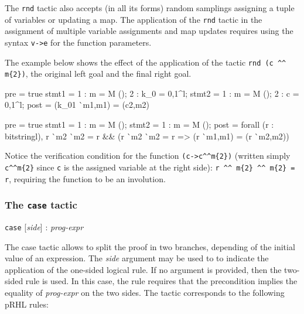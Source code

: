The \verb+rnd+ tactic also accepts (in all its forms) random samplings
assigning a tuple of variables or updating a map. The application of
the \verb+rnd+ tactic in the assignment of multiple variable
assignments and map updates requires using the syntax \verb+v->e+ for
the function parameters.


\Example The example below shows the effect of the application of the tactic
\verb+rnd (c ^^ m{2})+, the original left goal and the final
right goal.

\begin{minicode}{0.4}
pre   = true
stmt1 =   1 : m = M ();
          2 : k_0 = {0,1}^l;
stmt2 =   1 : m = M ();
          2 : c = {0,1}^l;
post  = (k_0{1} ^^ m{1},m{1}) 
            = (c{2},m{2})
\end{minicode}
\begin{minicode}{0.5}
pre   = true
stmt1 =   1 : m = M ();
stmt2 =   1 : m = M ();
post  = forall (r : bitstring{l}),
          r ^^ m{2} ^^ m{2} = r 
          && (r ^^ m{2} ^^ m{2} = r =>
            (r ^^ m{1},m{1}) = (r ^^ m{2},m{2}))
\end{minicode}
\vspace{2ex}

Notice the verification condition for the function \verb+(c->c^^m{2})+
(written simply \verb+c^^m{2}+ since \verb+c+ is the assigned variable at the
right side): \verb+r ^^ m{2} ^^ m{2} = r+, requiring the function to
be an involution.

\subsubsection{The \texttt{case} tactic}\label{tac:case}\DONE
\Syntax \verb+case+ [\textit{side}] : \textit{prog-expr}

\Description The case tactic allows to split the proof in two
branches, depending of the initial value of an expression.  The
\textit{side} argument may be used to to indicate the application of
the one-sided logical rule.  If no argument is provided, then the
two-sided rule is used. In this case, the rule requires that the
precondition implies the equality of \textit{prog-expr} on the two
sides.  The tactic corresponds to the following pRHL rules:

